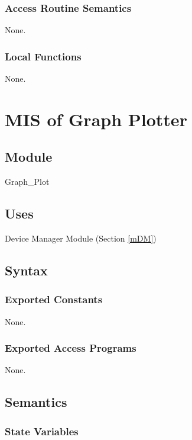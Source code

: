 \documentclass[12pt, titlepage]{article}
\begin{document}
\subsubsection{Access Routine Semantics}

None.

\subsubsection{Local Functions}

None.

\newpage

\section{MIS of Graph Plotter} \label{mGP} 

\subsection{Module}

Graph\_Plot

\subsection{Uses}

Device Manager Module (Section \ref{mDM})

\subsection{Syntax}

\subsubsection{Exported Constants}

None.

\subsubsection{Exported Access Programs}

None.

\subsection{Semantics}

\subsubsection{State Variables}
\end{document}
